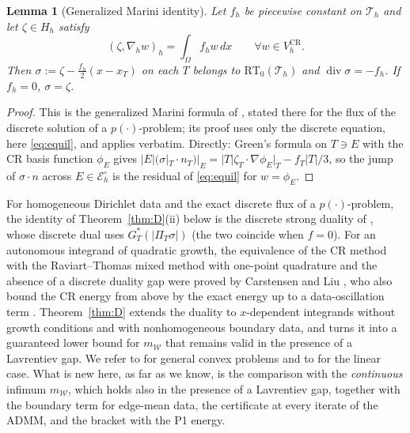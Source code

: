 \documentclass[11pt]{amsart}
\newtheorem{lemma}[theorem]{Lemma}
\theoremstyle{definition}
\theoremstyle{remark}
\numberwithin{equation}{section}
\newcommand{\dx}{\,dx}
\newcommand{\abs}[1]{\lvert #1\rvert}
\newcommand{\CR}{\mathrm{CR}}
\newcommand{\RT}{\mathrm{RT}_0}
\newcommand{\Th}{\mathcal T_h}
\newcommand{\Ei}{\mathcal E_h^{\circ}}
\newcommand{\mW}{m_{\mathcal W}}
\DeclareMathOperator{\divg}{div}
\begin{document}
\begin{lemma}[Generalized Marini identity]\label{lem:marini}
Let $f_h$ be piecewise constant on $\Th$ and let $\zeta\in H_h$ satisfy
\begin{equation}\label{eq:equil}
(\zeta,\nabla_hw)_h=\int_\Omega f_hw\dx\qquad\forall w\in V_h^{\CR}.
\end{equation}
Then $\sigma:=\zeta-\tfrac{f_h}{2}(x-x_T)$ on each $T$ belongs to $\RT(\Th)$ and $\divg\sigma=-f_h$. If $f_h=0$, $\sigma=\zeta$.
\end{lemma}
\begin{proof}
This is the generalized Marini formula of \cite[Prop.~2.37(ii)]{BalciKaltenbach2023}, stated there for the flux of the discrete solution of a $p(\cdot)$-problem; its proof uses only the discrete equation, here \eqref{eq:equil}, and applies verbatim. Directly: Green's formula on $T\ni E$ with the CR basis function $\phi_E$ gives $\abs E(\sigma|_T\cdot n_T)|_E=\abs T\zeta_T\cdot\nabla\phi_E|_T-f_T\abs T/3$, so the jump of $\sigma\cdot n$ across $E\in\Ei$ is the residual of \eqref{eq:equil} for $w=\phi_E$.
\end{proof}
For homogeneous Dirichlet data and the exact discrete flux of a $p(\cdot)$-problem, the identity of Theorem~\ref{thm:D}(ii) below is the discrete strong duality of \cite[Prop.~2.37(iii)]{BalciKaltenbach2023}, whose discrete dual uses $G_T^*(\abs{\Pi_T\sigma})$ (the two coincide when $f=0$). For an autonomous integrand of quadratic growth, the equivalence of the CR method with the Raviart--Thomas mixed method with one-point quadrature and the absence of a discrete duality gap were proved by Carstensen and Liu \cite[Thm.~3.1]{CarstensenLiu2015}, who also bound the CR energy from above by the exact energy up to a data-oscillation term \cite[(4.9)]{CarstensenLiu2015}. Theorem~\ref{thm:D} extends the duality to $x$-dependent integrands without growth conditions and with nonhomogeneous boundary data, and turns it into a guaranteed lower bound for $\mW$ that remains valid in the presence of a Lavrentiev gap. We refer to \cite{Bartels2021} for general convex problems and to \cite{Marini1985,ArnoldBrezzi1985} for the linear case. %
What is new here, as far as we know, is the comparison with the \emph{continuous} infimum $\mW$, which holds also in the presence of a Lavrentiev gap, together with the boundary term for edge-mean data, the certificate at every iterate of the ADMM, and the bracket with the P1 energy.
\end{document}
